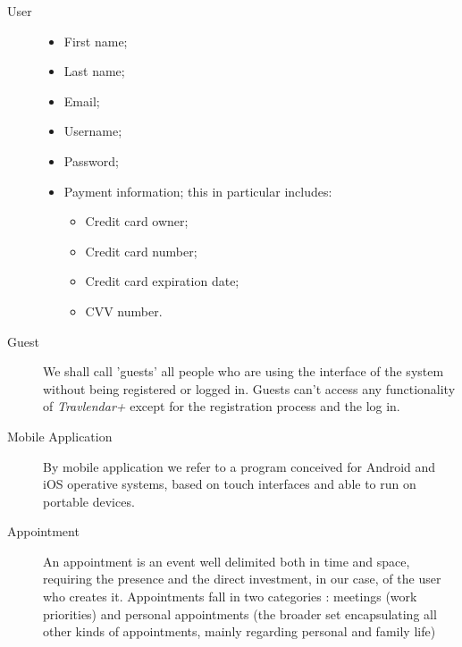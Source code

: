 \begin{description}
				\item[User] 
				\begin{itemize}
					\item First name;
					\item Last name; 
					\item Email;
					\item Username;
					\item Password;
					\item Payment information; this in particular includes:
						\begin{itemize}
							\item Credit card owner;
							\item Credit card number;
							\item Credit card expiration date;
							\item CVV number.
						\end{itemize}
				\end{itemize}
				
				\item[Guest] We shall call 'guests' all people who are using the interface of the system without being registered or logged in. Guests can't access any functionality of \textit{Travlendar+} except for the registration process and the log in. 
				
				\item[Mobile Application] By mobile application we refer to a program conceived for Android and iOS operative systems, based on touch interfaces and able to run on portable devices.
				\item[Appointment] An appointment is an event well delimited both in time and space, requiring the presence and the direct investment, in our case, of the user who creates it. Appointments fall in two categories : meetings (work priorities) and personal appointments (the broader set encapsulating all other kinds of appointments, mainly regarding personal and family life)
				
\end{description}